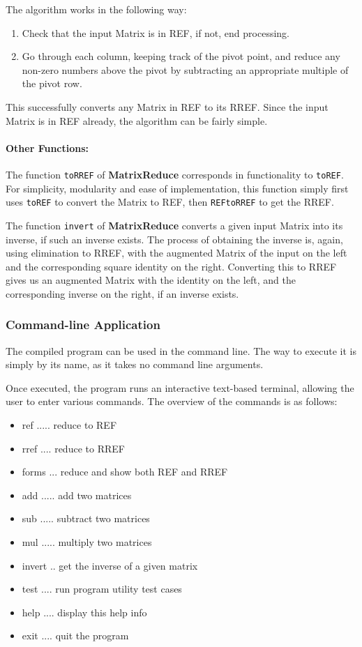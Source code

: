 \documentclass[11pt, a4paper]{article}
\begin{document}
The algorithm works in the following way:

\begin{enumerate}
  \item Check that the input Matrix is in REF, if not, end processing.
  \item Go through each column, keeping track of the pivot point, and reduce any non-zero numbers above the pivot by subtracting an appropriate multiple of the pivot row.
\end{enumerate}

This successfully converts any Matrix in REF to its RREF.
Since the input Matrix is in REF already, the algorithm can be fairly simple.

\paragraph{Other Functions:}

The function \texttt{toRREF} of \textbf{MatrixReduce} corresponds in functionality to \texttt{toREF}.
For simplicity, modularity and ease of implementation, this function simply first uses \texttt{toREF} to convert the Matrix to REF, then \texttt{REFtoRREF} to get the RREF.

The function \texttt{invert} of \textbf{MatrixReduce} converts a given input Matrix into its inverse, if such an inverse exists.
The process of obtaining the inverse is, again, using elimination to RREF, with the augmented Matrix of the input on the left and the corresponding square identity on the right.
Converting this to RREF gives us an augmented Matrix with the identity on the left, and the corresponding inverse on the right, if an inverse exists.


\subsubsection{Command-line Application}

The compiled program can be used in the command line.
The way to execute it is simply by its name, as it takes no command line arguments.

Once executed, the program runs an interactive text-based terminal, allowing the user to enter various commands.
The overview of the commands is as follows:

\begin{itemize}
  \item ref ..... reduce to REF
  \item rref .... reduce to RREF
  \item forms ... reduce and show both REF and RREF
  \item add ..... add two matrices
  \item sub ..... subtract two matrices
  \item mul ..... multiply two matrices
  \item invert .. get the inverse of a given matrix
  \item test .... run program utility test cases
  \item help .... display this help info
  \item exit .... quit the program
\end{itemize}
\end{document}
